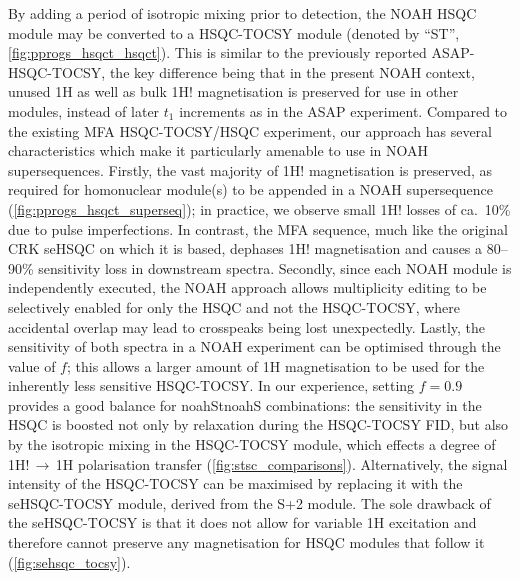 \documentclass[11pt]{article}
\newcommand*{\noahtwo}[2]{\csname noah#1\endcsname\csname noah#2\endcsname}
\newcommand*{\noahSpb}{S+2}
\newcommand*{\noahSt}{ST}
\newcommand*{\magn}[1]{1H#1}
\newcommand*{\magnnot}[1]{1H!#1}
\begin{document}
\begin{refsection}
By adding a period of isotropic mixing prior to detection, the NOAH HSQC module may be converted to a HSQC-TOCSY module (denoted by ``\noahSt{}'', \cref{fig:pprogs_hsqct_hsqct}).
This is similar to the previously reported ASAP-HSQC-TOCSY,\autocite{Becker2019JMR} the key difference being that in the present NOAH context, unused \magn{} as well as bulk \magnnot{} magnetisation is preserved for use in other modules, instead of later $t_1$ increments as in the ASAP experiment.
Compared to the existing MFA HSQC-TOCSY/HSQC experiment,\autocite{Nolis2019CPC} our approach has several characteristics which make it particularly amenable to use in NOAH supersequences.
Firstly, the vast majority of \magnnot{} magnetisation is preserved, as required for homonuclear module(s) to be appended in a NOAH supersequence (\cref{fig:pprogs_hsqct_superseq}); in practice, we observe small \magnnot{} losses of ca.\ 10\% due to pulse imperfections.
In contrast, the MFA sequence, much like the original CRK seHSQC on which it is based, dephases \magnnot{} magnetisation and causes a 80--90\% sensitivity loss in downstream spectra.
Secondly, since each NOAH module is independently executed, the NOAH approach allows multiplicity editing to be selectively enabled for only the HSQC and not the HSQC-TOCSY, where accidental overlap may lead to crosspeaks being lost unexpectedly.
Lastly, the sensitivity of both spectra in a NOAH experiment can be optimised through the value of $f$; this allows a larger amount of \magn{} magnetisation to be used for the inherently less sensitive HSQC-TOCSY.
In our experience, setting $f = 0.9$ provides a good balance for \noahtwo{St}{S} combinations: the sensitivity in the HSQC is boosted not only by relaxation during the HSQC-TOCSY FID, but also by the isotropic mixing in the HSQC-TOCSY module, which effects a degree of \magnnot{}\,$\to\,$\magn{} polarisation transfer (\cref{fig:stsc_comparisons}).
Alternatively, the signal intensity of the HSQC-TOCSY can be maximised by replacing it with the seHSQC-TOCSY module, derived from the \noahSpb{} module.\autocite{Hansen2021}
The sole drawback of the seHSQC-TOCSY is that it does not allow for variable \magn{} excitation and therefore cannot preserve any magnetisation for HSQC modules that follow it (\cref{fig:sehsqc_tocsy}).



\end{refsection}
\end{document}
